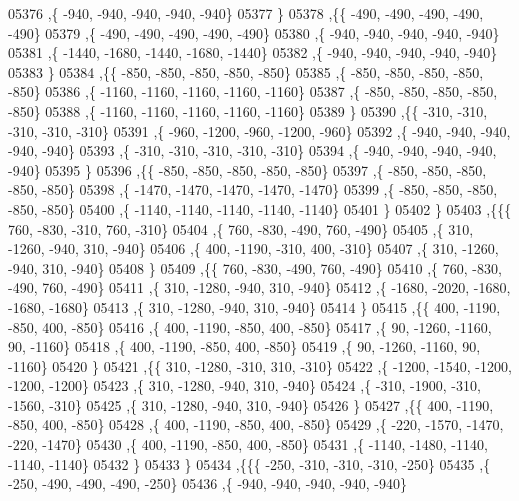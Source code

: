 \begin{DoxyCode}
05376     ,\{  -940,  -940,  -940,  -940,  -940\}
05377     \}
05378    ,\{\{  -490,  -490,  -490,  -490,  -490\}
05379     ,\{  -490,  -490,  -490,  -490,  -490\}
05380     ,\{  -940,  -940,  -940,  -940,  -940\}
05381     ,\{ -1440, -1680, -1440, -1680, -1440\}
05382     ,\{  -940,  -940,  -940,  -940,  -940\}
05383     \}
05384    ,\{\{  -850,  -850,  -850,  -850,  -850\}
05385     ,\{  -850,  -850,  -850,  -850,  -850\}
05386     ,\{ -1160, -1160, -1160, -1160, -1160\}
05387     ,\{  -850,  -850,  -850,  -850,  -850\}
05388     ,\{ -1160, -1160, -1160, -1160, -1160\}
05389     \}
05390    ,\{\{  -310,  -310,  -310,  -310,  -310\}
05391     ,\{  -960, -1200,  -960, -1200,  -960\}
05392     ,\{  -940,  -940,  -940,  -940,  -940\}
05393     ,\{  -310,  -310,  -310,  -310,  -310\}
05394     ,\{  -940,  -940,  -940,  -940,  -940\}
05395     \}
05396    ,\{\{  -850,  -850,  -850,  -850,  -850\}
05397     ,\{  -850,  -850,  -850,  -850,  -850\}
05398     ,\{ -1470, -1470, -1470, -1470, -1470\}
05399     ,\{  -850,  -850,  -850,  -850,  -850\}
05400     ,\{ -1140, -1140, -1140, -1140, -1140\}
05401     \}
05402    \}
05403   ,\{\{\{   760,  -830,  -310,   760,  -310\}
05404     ,\{   760,  -830,  -490,   760,  -490\}
05405     ,\{   310, -1260,  -940,   310,  -940\}
05406     ,\{   400, -1190,  -310,   400,  -310\}
05407     ,\{   310, -1260,  -940,   310,  -940\}
05408     \}
05409    ,\{\{   760,  -830,  -490,   760,  -490\}
05410     ,\{   760,  -830,  -490,   760,  -490\}
05411     ,\{   310, -1280,  -940,   310,  -940\}
05412     ,\{ -1680, -2020, -1680, -1680, -1680\}
05413     ,\{   310, -1280,  -940,   310,  -940\}
05414     \}
05415    ,\{\{   400, -1190,  -850,   400,  -850\}
05416     ,\{   400, -1190,  -850,   400,  -850\}
05417     ,\{    90, -1260, -1160,    90, -1160\}
05418     ,\{   400, -1190,  -850,   400,  -850\}
05419     ,\{    90, -1260, -1160,    90, -1160\}
05420     \}
05421    ,\{\{   310, -1280,  -310,   310,  -310\}
05422     ,\{ -1200, -1540, -1200, -1200, -1200\}
05423     ,\{   310, -1280,  -940,   310,  -940\}
05424     ,\{  -310, -1900,  -310, -1560,  -310\}
05425     ,\{   310, -1280,  -940,   310,  -940\}
05426     \}
05427    ,\{\{   400, -1190,  -850,   400,  -850\}
05428     ,\{   400, -1190,  -850,   400,  -850\}
05429     ,\{  -220, -1570, -1470,  -220, -1470\}
05430     ,\{   400, -1190,  -850,   400,  -850\}
05431     ,\{ -1140, -1480, -1140, -1140, -1140\}
05432     \}
05433    \}
05434   ,\{\{\{  -250,  -310,  -310,  -310,  -250\}
05435     ,\{  -250,  -490,  -490,  -490,  -250\}
05436     ,\{  -940,  -940,  -940,  -940,  -940\}

\end{DoxyCode}
